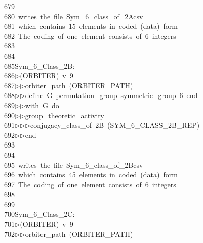 \begin{tabbing}
679\>\\[0pt]
680\>\ writes\ the\ file\ Sym\_6\_class\_of\_2Acsv\\[0pt]
681\>\ which\ contains\ 15\ elements\ in\ coded\ (data)\ form\\[0pt]
682\>\ The\ coding\ of\ one\ element\ consists\ of\ 6\ integers\\[0pt]
683\>\\[0pt]
684\>\\[0pt]
685\>Sym\_6\_Class\_2B:\\[0pt]
686\>$\triangleright$\>(ORBITER)\ v\ 9\ \\[0pt]
687\>$\triangleright$\>$\triangleright$\>orbiter\_path\ (ORBITER\_PATH)\ \\[0pt]
688\>$\triangleright$\>$\triangleright$\>define\ G\ permutation\_group\ symmetric\_group\ 6\ end\ \\[0pt]
689\>$\triangleright$\>$\triangleright$\>with\ G\ do\ \\[0pt]
690\>$\triangleright$\>$\triangleright$\>group\_theoretic\_activity\ \\[0pt]
691\>$\triangleright$\>$\triangleright$\>$\triangleright$\>conjugacy\_class\_of\ 2B\ (SYM\_6\_CLASS\_2B\_REP)\ \\[0pt]
692\>$\triangleright$\>$\triangleright$\>end\\[0pt]
693\>\\[0pt]
694\>\\[0pt]
695\>\ writes\ the\ file\ Sym\_6\_class\_of\_2Bcsv\\[0pt]
696\>\ which\ contains\ 45\ elements\ in\ coded\ (data)\ form\\[0pt]
697\>\ The\ coding\ of\ one\ element\ consists\ of\ 6\ integers\\[0pt]
698\>\\[0pt]
699\>\\[0pt]
700\>Sym\_6\_Class\_2C:\\[0pt]
701\>$\triangleright$\>(ORBITER)\ v\ 9\ \\[0pt]
702\>$\triangleright$\>$\triangleright$\>orbiter\_path\ (ORBITER\_PATH)\ \\[0pt]

\end{tabbing}
